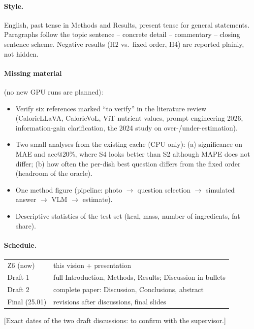 \documentclass[twocolumn]{svjour3}
\newcommand{\open}[1]{\textcolor{red!70!black}{[#1]}} %
\begin{document}
\paragraph{Style.} English, past tense in Methods and Results, present tense for general statements.
Paragraphs follow the topic sentence -- concrete detail -- commentary -- closing sentence scheme.
Negative results (H2 vs.\ fixed order, H4) are reported plainly, not hidden.

\paragraph{Missing material} (no new GPU runs are planned):
\begin{itemize}
  \item Verify six references marked ``to verify'' in the literature review (CalorieLLaVA, CalorieVoL,
        ViT nutrient values, prompt engineering 2026, information-gain clarification, the 2024 study on
        over-/under-estimation).
  \item Two small analyses from the existing cache (CPU only): (a) significance on MAE and acc@20\%,
        where S4 looks better than S2 although MAPE does not differ; (b) how often the per-dish best
        question differs from the fixed order (headroom of the oracle).
  \item One method figure (pipeline: photo $\rightarrow$ question selection $\rightarrow$ simulated
        answer $\rightarrow$ VLM $\rightarrow$ estimate).
  \item Descriptive statistics of the test set (kcal, mass, number of ingredients, fat share).
\end{itemize}

\paragraph{Schedule.}
\begin{tabular}{@{}ll@{}}
  Z6 (now)       & this vision + presentation \\
  Draft 1        & full Introduction, Methods, Results; Discussion in bullets \\
  Draft 2        & complete paper: Discussion, Conclusions, abstract \\
  Final (25.01)  & revisions after discussions, final slides \\
\end{tabular}
\open{Exact dates of the two draft discussions: to confirm with the supervisor.}
\end{document}

